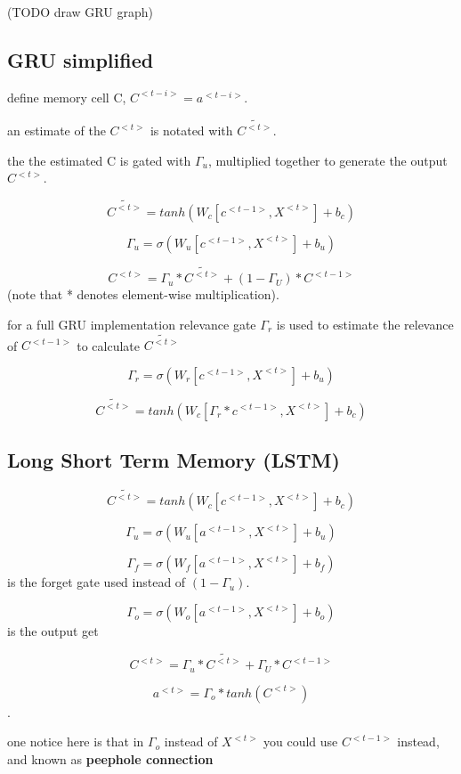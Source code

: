 \documentclass[4apaper,12pt]{book}
\begin{document}
\begin{description}
\begin{description}
\begin{description}
      \item (TODO draw GRU graph)
        \subsection{GRU simplified}
        \begin{description}
        \item define memory cell C, $C^{<t-i>} = a^{<t-i>}$.
        \item an estimate of the $C^{<t>}$ is notated with  $\tilde{C^{<t>}}$.
        \item the the estimated C is gated with $\Gamma_u$, multiplied together to generate the output $C^{<t>}$.
        \item $$\tilde{C^{<t>}}=tanh(W_c[c^{<t-1>},X^{<t>}]+b_c) $$
        \item $$ \Gamma_u = \sigma(W_u[c^{<t-1>},X^{<t>}]+b_u) $$
        \item $$ C^{<t>}=\Gamma_u * \tilde{C^{<t>}} + (1-\Gamma_U)*C^{<t-1>}$$ (note that * denotes element-wise multiplication).
        \end{description}
      \end{description}
    \item for a full GRU implementation relevance gate $\Gamma_r$ is used to estimate the relevance of $C^{<t-1>}$ to calculate $\tilde{C^{<t>}}$
    \item \item $$ \Gamma_r = \sigma(W_r[c^{<t-1>},X^{<t>}]+b_u) $$
    \item $$\tilde{C^{<t>}}=tanh(W_c[\Gamma_r*c^{<t-1>},X^{<t>}]+b_c) $$
    \end{description}
    \subsection{Long Short Term Memory (LSTM)}
    \begin{description}
    \item $$\tilde{C^{<t>}}=tanh(W_c[c^{<t-1>},X^{<t>}]+b_c) $$
    \item $$ \Gamma_u = \sigma(W_u[a^{<t-1>},X^{<t>}]+b_u) $$
    \item $$ \Gamma_f = \sigma(W_f[a^{<t-1>},X^{<t>}]+b_f) $$ is the forget gate used instead of $(1-\Gamma_u)$.
    \item $$ \Gamma_o = \sigma(W_o[a^{<t-1>},X^{<t>}]+b_o) $$ is the output get
    \item $$ C^{<t>}=\Gamma_u * \tilde{C^{<t>}} + \Gamma_U*C^{<t-1>}$$
    \item $$ a^{<t>} = \Gamma_o * tanh(C^{<t>})$$.
    \item one notice here is that in $\Gamma_o$ instead of $X^{<t>}$ you could use $C^{<t-1>}$ instead, and known as \textbf{peephole connection}
    \end{description}
  \end{description}
\end{document}
